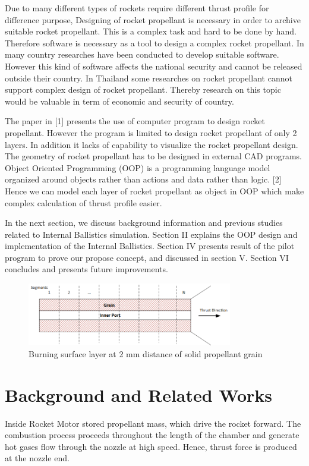 \documentclass[conference]{IEEEtran}
\begin{document}
Due to many different types of rockets require different thrust profile for difference purpose, Designing of rocket propellant is necessary in order to archive suitable rocket propellant. This is a complex task and hard to be done by hand. Therefore software is necessary as a tool to design a complex rocket propellant. In many country researches have been conducted to develop suitable software. However this kind of software affects the national security and cannot be released outside their country. In Thailand some researches on rocket propellant cannot support complex design of rocket propellant. Thereby research on this topic would be valuable in term of economic and security of country.

The paper in [1] presents the use of computer program to design rocket propellant. However the program is limited to design rocket propellant of only 2 layers. In addition it lacks of capability to visualize the rocket propellant design. The geometry of rocket propellant has to be designed in external CAD programs. Object Oriented Programming (OOP) is a programming language model organized around objects rather than actions and data rather than logic. [2] Hence we can model each layer of rocket propellant as object in OOP which make complex calculation of thrust profile easier.

In the next section, we discuss background information and previous studies related to Internal Ballistics simulation. Section II explains the OOP design and implementation of the Internal Ballistics. Section IV presents result of the pilot program to prove our propose concept, and discussed in section V. Section VI concludes and presents future improvements.

\begin{figure}[t]
\centering
\includegraphics[width=0.8\textwidth]{propellant_cut}
\caption{Burning surface layer at 2 mm distance of solid propellant grain}
\label{fig:2_1}
\end{figure}

\section{Background and Related Works}
Inside Rocket Motor stored propellant mass, which drive the rocket forward. The combustion process proceeds throughout the length of the chamber and generate hot gases flow through the nozzle at high speed. Hence, thrust force is produced at the nozzle end.
\end{document}
